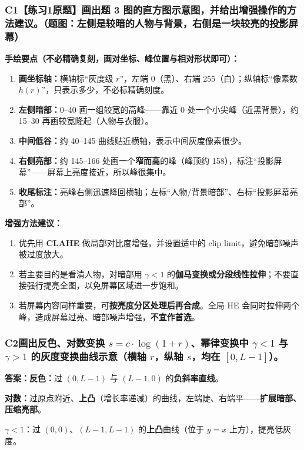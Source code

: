 \subsubsection*{C1【练习1原题】画出题 3 图的直方图示意图，并给出增强操作的方法建议。（题图：左侧是较暗的人物与背景，右侧是一块较亮的投影屏幕）}
\textbf{手绘要点（不必精确复刻，画对坐标、峰位置与相对形状即可）：}
\begin{enumerate}[label=\arabic*.,leftmargin=*]
\item \textbf{画坐标轴：}横轴标“灰度级 $r$”，左端 0（黑）、右端 255（白）；纵轴标“像素数 $h(r)$”，只表示多少，不必标精确刻度。
\item \textbf{左侧暗部：}0--40 画一组较宽的高峰——靠近 0 处一个小尖峰（近黑背景），约 15--30 再画较宽隆起（人物与衣服）。
\item \textbf{中间低谷：}约 40--145 曲线贴近横轴，表示中间灰度像素很少。
\item \textbf{右侧亮部：}约 145--166 处画一个\textbf{窄而高}的峰（峰顶约 158），标注“投影屏幕”——屏幕上亮度接近，所以峰很集中。
\item \textbf{收尾标注：}亮峰右侧迅速降回横轴；左标“人物/背景暗部”、右标“投影屏幕亮部”。
\end{enumerate}
\textbf{增强方法建议：}
\begin{enumerate}[label=\arabic*.,leftmargin=*]
\item 优先用 \textbf{CLAHE} 做局部对比度增强，并设置适中的 clip limit，避免暗部噪声被过度放大。
\item 若主要目的是看清人物，对暗部用 $\gamma<1$ 的\textbf{伽马变换或分段线性拉伸}；不要直接强行提亮全图，以免屏幕区域进一步饱和。
\item 若屏幕内容同样重要，可\textbf{按亮度分区处理后再合成}。全局 HE 会同时拉伸两个峰，造成屏幕过亮、暗部噪声增强，\textbf{不宜作首选}。
\end{enumerate}

\subsubsection*{C2\quad 画出反色、对数变换 $s=c\cdot\log(1+r)$、幂律变换中 $\gamma<1$ 与 $\gamma>1$ 的灰度变换曲线示意（横轴 $r$，纵轴 $s$，均在 $[0,L-1]$）。}
\textbf{答案：反色：}过 $(0,L-1)$ 与 $(L-1,0)$ 的\textbf{负斜率直线}。

\textbf{对数：}过原点附近、\textbf{上凸}（增长率递减）的曲线，左端陡、右端平——\textbf{扩展暗部、压缩亮部}。

$\gamma<1$：过 $(0,0)$、$(L-1,L-1)$ 的\textbf{上凸}曲线（位于 $y=x$ 上方），提亮低灰度。

